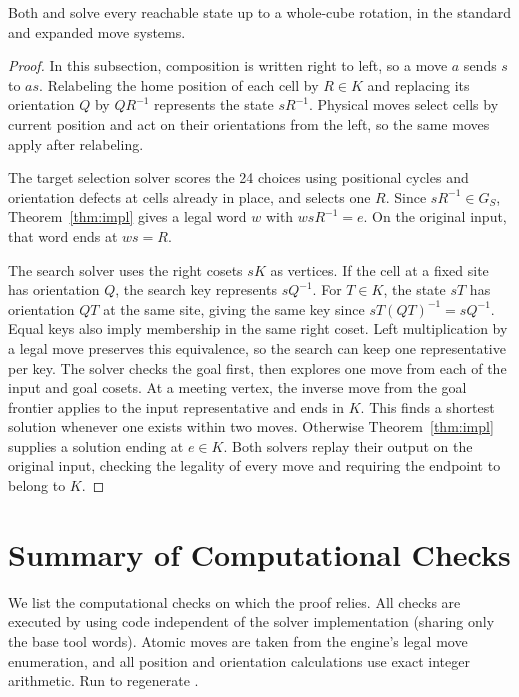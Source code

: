 \documentclass[a4paper,11pt]{article}
\begin{document}
\begin{corollary}
Both  and 
solve every reachable state up to a whole-cube rotation, in the standard and expanded move systems.
\end{corollary}

\begin{proof}
In this subsection, composition is written right to left, so a move $a$ sends $s$ to $as$.
Relabeling the home position of each cell by $R\in K$ and replacing its orientation $Q$ by $QR^{-1}$
represents the state $sR^{-1}$.
Physical moves select cells by current position and act on their orientations from the left, so the same moves apply after relabeling.

The target selection solver scores the 24 choices using positional cycles and orientation defects at cells already in place, and selects one $R$.
Since $sR^{-1}\in G_S$, Theorem~\ref{thm:impl} gives a legal word $w$ with $wsR^{-1}=e$.
On the original input, that word ends at $ws=R$.

The search solver uses the right cosets $sK$ as vertices.
If the cell at a fixed site has orientation $Q$, the search key represents $sQ^{-1}$.
For $T\in K$, the state $sT$ has orientation $QT$ at the same site, giving the same key since $sT(QT)^{-1}=sQ^{-1}$.
Equal keys also imply membership in the same right coset.
Left multiplication by a legal move preserves this equivalence, so the search can keep one representative per key.
The solver checks the goal first, then explores one move from each of the input and goal cosets.
At a meeting vertex, the inverse move from the goal frontier applies to the input representative and ends in $K$.
This finds a shortest solution whenever one exists within two moves.
Otherwise Theorem~\ref{thm:impl} supplies a solution ending at $e\in K$.
Both solvers replay their output on the original input, checking the legality of every move and requiring the endpoint to belong to $K$.
\end{proof}

\section{Summary of Computational Checks}\label{sec:checks}

We list the computational checks on which the proof relies.
All checks are executed by  using code independent of the solver implementation (sharing only the base tool words). Atomic moves are taken from the engine's legal move enumeration, and all position and orientation calculations use exact integer arithmetic.
Run  to regenerate .
\end{document}
